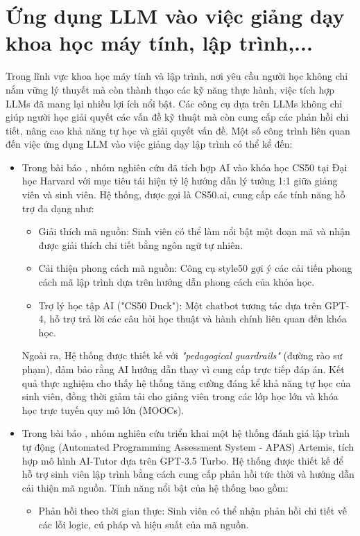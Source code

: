 \section{Ứng dụng LLM vào việc giảng dạy khoa học máy tính, lập trình,...}
Trong lĩnh vực khoa học máy tính và lập trình, nơi yêu cầu người học không chỉ nắm vững lý thuyết mà còn thành thạo các kỹ năng thực hành, việc tích hợp LLMs đã mang lại nhiều lợi ích nổi bật. Các công cụ dựa trên LLMs không chỉ giúp người học giải quyết các vấn đề kỹ thuật mà còn cung cấp các phản hồi chi tiết, nâng cao khả năng tự học và giải quyết vấn đề. Một số công trình liên quan đến việc ứng dụng LLM vào việc giảng dạy lập trình có thể kể đến:
\begin{itemize}
    \item Trong bài báo \cite{10.1145/3626252.3630938}, nhóm nghiên cứu đã tích hợp AI vào khóa học CS50 tại Đại học Harvard với mục tiêu tái hiện tỷ lệ hướng dẫn lý tưởng 1:1 giữa giảng viên và sinh viên. Hệ thống, được gọi là CS50.ai, cung cấp các tính năng hỗ trợ đa dạng như:
    \begin{itemize}
        \item Giải thích mã nguồn: Sinh viên có thể làm nổi bật một đoạn mã và nhận được giải thích chi tiết bằng ngôn ngữ tự nhiên.
        \item Cải thiện phong cách mã nguồn: Công cụ style50 gợi ý các cải tiến phong cách mã lập trình dựa trên hướng dẫn phong cách của khóa học.
        \item Trợ lý học tập AI ("CS50 Duck"): Một chatbot tương tác dựa trên GPT-4, hỗ trợ trả lời các câu hỏi học thuật và hành chính liên quan đến khóa học.
    \end{itemize}
    Ngoài ra, Hệ thống được thiết kế với \emph{"pedagogical guardrails"} (đường rào sư phạm), đảm bảo rằng AI hướng dẫn thay vì cung cấp trực tiếp đáp án. Kết quả thực nghiệm cho thấy hệ thống tăng cường đáng kể khả năng tự học của sinh viên, đồng thời giảm tải cho giảng viên trong các lớp học lớn và khóa học trực tuyến quy mô lớn (MOOCs).
    \item Trong bài báo \cite{Frankford_2024}, nhóm nghiên cứu triển khai một hệ thống đánh giá lập trình tự động (Automated Programming Assessment System - APAS) Artemis, tích hợp mô hình AI-Tutor dựa trên GPT-3.5 Turbo. Hệ thống được thiết kế để hỗ trợ sinh viên lập trình bằng cách cung cấp phản hồi tức thời và hướng dẫn cải thiện mã nguồn. Tính năng nổi bật của hệ thống bao gồm:
    \begin{itemize}
        \item Phản hồi theo thời gian thực: Sinh viên có thể nhận phản hồi chi tiết về các lỗi logic, cú pháp và hiệu suất của mã nguồn.

\end{itemize}
\end{itemize}
